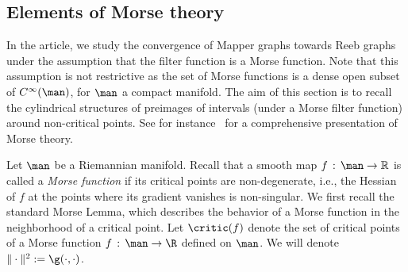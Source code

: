 \subsection{Elements of Morse theory}
In the article, we study the convergence of Mapper graphs towards Reeb graphs under the assumption that the filter function is a Morse function. Note that this assumption is not restrictive as the set of Morse functions is a dense open subset of $C^{\infty}(\man)$, for $\man$ a compact manifold. The aim of this section is to recall the cylindrical structures of preimages of intervals (under a Morse filter function) around non-critical points. See for instance~\cite{milnor1963morse} for a comprehensive presentation of Morse theory.



Let $\man$ be a Riemannian manifold. Recall that a smooth map $f\,:\,\man\rightarrow \mathbb{R}$ is called a {\it Morse function} if its critical points are non-degenerate, i.e., the Hessian of $f$ at the points where its gradient vanishes is non-singular.  We first recall the standard Morse Lemma, which describes the behavior of a Morse function in the neighborhood of a critical point.  Let $\critic(f)$ denote the set of critical points of a Morse function $f\,:\,\man\rightarrow \R$ defined on $\man$. We will denote $\Vert\cdot\Vert^2:=\g(\cdot, \cdot)$.

